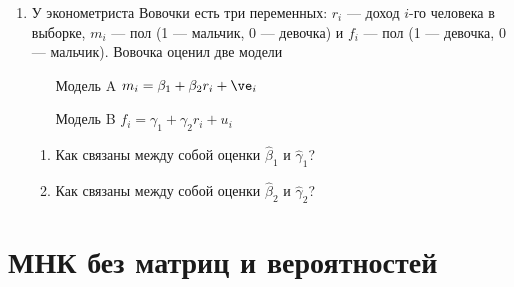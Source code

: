 \documentclass[pdftex,12pt,a4paper]{article}
\def \hb{\hat{\beta}}
\newcommand{\solution}[1]{}
\begin{document}
\begin{enumerate}
\item У эконометриста Вовочки есть три переменных: $r_i$ --- доход $i$-го человека в выборке, $m_i$ --- пол (1 --- мальчик, 0 --- девочка) и $f_i$ --- пол (1 --- девочка, 0 --- мальчик). Вовочка оценил две модели
\begin{enumerate}
\item[Модель A] $m_i=\beta_1+\beta_2 r_i+\ve_i$
\item[Модель B] $f_i=\gamma_1+\gamma_2 r_i+u_i$
\end{enumerate}
\begin{enumerate}
\item Как связаны между собой оценки $\hb_1$ и $\hat{\gamma}_1$?
\item Как связаны между собой оценки $\hb_2$ и $\hat{\gamma}_2$? 
\end{enumerate}
\solution{ Оценки МНК линейны по объясняемой переменной. Если сложить объясняемые переменные в этих двух моделях, то получится вектор из единичек. Если строить регрессию вектора из единичек на константу и $r$, то получатся оценки коэффициентов 1 и 0. Значит, $\hb_1+\hat{\gamma}_1=1$, $\hb_2+\hat{\gamma}_2=0$ }





\end{enumerate}

\section{МНК без матриц и вероятностей}
\end{document}
